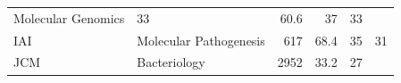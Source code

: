 \documentclass[11pt,]{article}
\begin{document}
\begin{longtable}[]{@{}llrrrr@{}}
\begin{minipage}[t]{0.43\columnwidth}
Molecular Genomics\strut
\end{minipage} & \begin{minipage}[t]{0.04\columnwidth}\raggedleft\strut
33\strut
\end{minipage} & \begin{minipage}[t]{0.08\columnwidth}\raggedleft\strut
60.6\strut
\end{minipage} & \begin{minipage}[t]{0.11\columnwidth}\raggedleft\strut
37\strut
\end{minipage} & \begin{minipage}[t]{0.11\columnwidth}\raggedleft\strut
33\strut
\end{minipage}\tabularnewline
\begin{minipage}[t]{0.06\columnwidth}\raggedright\strut
IAI\strut
\end{minipage} & \begin{minipage}[t]{0.43\columnwidth}\raggedright\strut
Molecular Pathogenesis\strut
\end{minipage} & \begin{minipage}[t]{0.04\columnwidth}\raggedleft\strut
617\strut
\end{minipage} & \begin{minipage}[t]{0.08\columnwidth}\raggedleft\strut
68.4\strut
\end{minipage} & \begin{minipage}[t]{0.11\columnwidth}\raggedleft\strut
35\strut
\end{minipage} & \begin{minipage}[t]{0.11\columnwidth}\raggedleft\strut
31\strut
\end{minipage}\tabularnewline
\begin{minipage}[t]{0.06\columnwidth}\raggedright\strut
JCM\strut
\end{minipage} & \begin{minipage}[t]{0.43\columnwidth}\raggedright\strut
Bacteriology\strut
\end{minipage} & \begin{minipage}[t]{0.04\columnwidth}\raggedleft\strut
2952\strut
\end{minipage} & \begin{minipage}[t]{0.08\columnwidth}\raggedleft\strut
33.2\strut
\end{minipage} & \begin{minipage}[t]{0.11\columnwidth}\raggedleft\strut
27\strut
\end{minipage} & \begin{minipage}[t]{0.11\columnwidth}\raggedleft\strut

\end{minipage}
\end{longtable}
\end{document}
